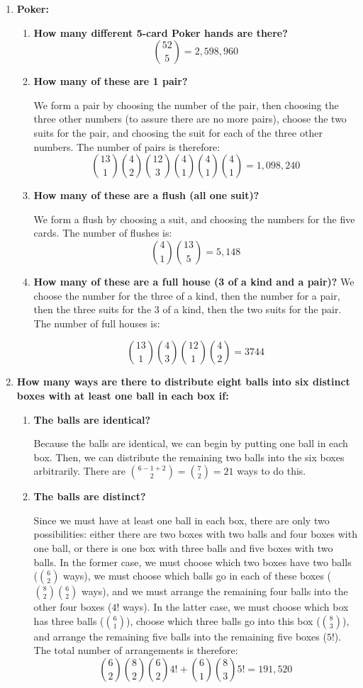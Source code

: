 \documentclass[12pt]{amsart}
\begin{document}
\begin{enumerate}
\item {\bf Poker:}
\begin{enumerate}
\item {\bf How many different 5-card Poker hands are there?}
$$
{52 \choose 5} = 2,598,960
$$
\item {\bf How many of these are 1 pair?}

We form a pair by choosing the number of the pair, then choosing the
three other numbers (to assure there are no more pairs), choose the
two suits for the pair, and choosing the suit for each of the three
other numbers.  The number of pairs is therefore:
$$
{13 \choose 1}{4 \choose 2}{12 \choose 3}{4 \choose 1}{4 \choose
1}{4 \choose 1} = 1,098,240$$

\item {\bf How many of these are a flush (all one suit)?}

We form a flush by choosing a suit, and choosing the numbers for the
five cards.  The number of flushes is:
$$
{4 \choose 1}{13 \choose 5} = 5,148
$$

\item {\bf How many of these are a full house (3 of a kind and a pair)?}
We choose the number for the three of a kind, then the number for a
pair, then the three suits for the 3 of a kind, then the two suits for
the pair.  The number of full houses is:

$$
{13 \choose 1}{4 \choose 3}{12 \choose 1}{4 \choose 2} = 3744
$$

\end{enumerate}

\medskip

\item {\bf How many ways are there to distribute eight balls into six distinct boxes with at least one ball in each box if:}
\begin{enumerate}
\item {\bf The balls are identical?}

Because the balls are identical, we can begin by putting one ball in
each box.  Then, we can distribute the remaining two balls into the
six boxes arbitrarily.  There are ${6 - 1 + 2 \choose 2} = {7 \choose
2} = 21$ ways to do this.

\item {\bf The balls are distinct?}

Since we must have at least one ball in each box, there are only two
possibilities: either there are two boxes with two balls and four
boxes with one ball, or there is one box with three balls and five
boxes with two balls.  In the former case, we must choose which two
boxes have two balls ($6 \choose 2$ ways), we must choose which balls
go in each of these boxes (${8 \choose 2}{6 \choose 2}$ ways), and we
must arrange the remaining four balls into the other four boxes ($4!$
ways).  In the latter case, we must choose which box has three balls
($6 \choose 1$), choose which three balls go into this box ($8 \choose
3$), and arrange the remaining five balls into the remaining five
boxes ($5!$).  The total number of arrangements is therefore:
$$
{6 \choose 2}{8 \choose 2}{6 \choose 2}4! + {6 \choose 1}{8 \choose 3}5! = 191,520
$$



\end{enumerate}
\end{enumerate}
\end{document}
